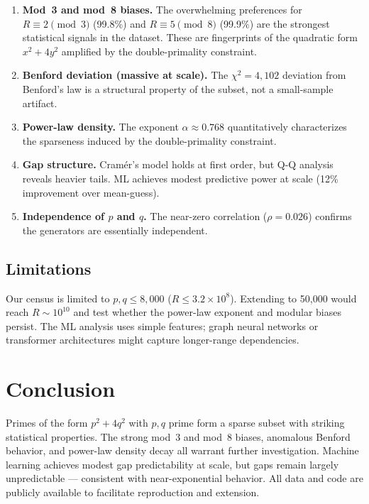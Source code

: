 \documentclass[12pt,a4paper]{article}
\begin{document}
\begin{enumerate}
\item \textbf{Mod~3 and mod~8 biases.} The overwhelming preferences
for $R \equiv 2 \pmod{3}$ (99.8\%) and $R \equiv 5 \pmod{8}$
(99.9\%) are the strongest statistical signals in the dataset.
These are fingerprints of the quadratic form $x^{2}+4y^{2}$
amplified by the double-primality constraint.

\item \textbf{Benford deviation (massive at scale).}
The $\chi^{2}=4{,}102$ deviation from Benford's law is a
structural property of the subset, not a small-sample artifact.

\item \textbf{Power-law density.} The exponent $\alpha \approx 0.768$
quantitatively characterizes the sparseness induced by the
double-primality constraint.

\item \textbf{Gap structure.} Cram\'er's model holds at first order,
but Q-Q analysis reveals heavier tails. ML achieves modest
predictive power at scale (12\% improvement over mean-guess).

\item \textbf{Independence of $p$ and $q$.} The near-zero
correlation ($\rho = 0.026$) confirms the generators are
essentially independent.
\end{enumerate}

\subsection{Limitations}

Our census is limited to $p,q \leq 8{,}000$ ($R \leq 3.2\times10^{8}$).
Extending to 50,000 would reach $R \sim 10^{10}$ and test whether the
power-law exponent and modular biases persist. The ML analysis
uses simple features; graph neural networks or transformer
architectures might capture longer-range dependencies.

\section{Conclusion}

Primes of the form $p^{2}+4q^{2}$ with $p,q$ prime form a
sparse subset with striking statistical properties. The
strong mod~3 and mod~8 biases, anomalous Benford behavior,
and power-law density decay all warrant further investigation.
Machine learning achieves modest gap predictability at scale,
but gaps remain largely unpredictable --- consistent with
near-exponential behavior. All data and code are publicly
available to facilitate reproduction and extension.
\end{document}
